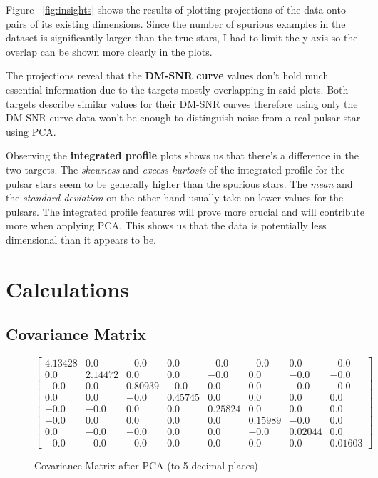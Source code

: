 \documentclass[a4paper,12pt]{article}
\begin{document}
    Figure ~\ref{fig:insights} shows the results of plotting projections of the data onto pairs of its existing dimensions. Since the number of spurious examples in the dataset is significantly larger than the true stars, I had to limit the y axis so the overlap can be shown more clearly in the plots. \par
    The projections reveal that the \textbf{DM-SNR curve} values don’t hold much essential information due to the targets mostly overlapping in said plots. Both targets describe similar values for their DM-SNR curves therefore using only the DM-SNR curve data won’t be enough to distinguish noise from a real pulsar star using PCA. \par
    Observing the \textbf{integrated profile} plots shows us that there’s a difference in the two targets. The \textit{skewness} and \textit{excess kurtosis} of the integrated profile for the pulsar stars seem to be generally higher than the spurious stars. The \textit{mean} and the \textit{standard deviation} on the other hand usually take on lower values for the pulsars. The integrated profile features will prove more crucial and will contribute more when applying PCA. This shows us that the data is potentially less dimensional than it appears to be.

    \newpage

    \section{Calculations}

    \subsection{Covariance Matrix}

    \setcounter{MaxMatrixCols}{20}
    \begin{figure}[h]
        \centering
        \begin{math}
            \begin{bmatrix}
                4.13428&0.0&-0.0&0.0&-0.0&-0.0&0.0&-0.0\\
                0.0&2.14472&0.0&0.0&-0.0&0.0&-0.0&-0.0\\
                -0.0&0.0&0.80939&-0.0&0.0&0.0&-0.0&-0.0\\
                0.0&0.0&-0.0&0.45745&0.0&0.0&0.0&0.0\\
                -0.0&-0.0&0.0&0.0&0.25824&0.0&0.0&0.0\\
                -0.0&0.0&0.0&0.0&0.0&0.15989&-0.0&0.0\\
                0.0&-0.0&-0.0&0.0&0.0&-0.0&0.02044&0.0\\
                -0.0&-0.0&-0.0&0.0&0.0&0.0&0.0&0.01603
            \end{bmatrix}
        \end{math}
        \caption{Covariance Matrix after PCA (to 5 decimal places)}
    \end{figure}
\end{document}
